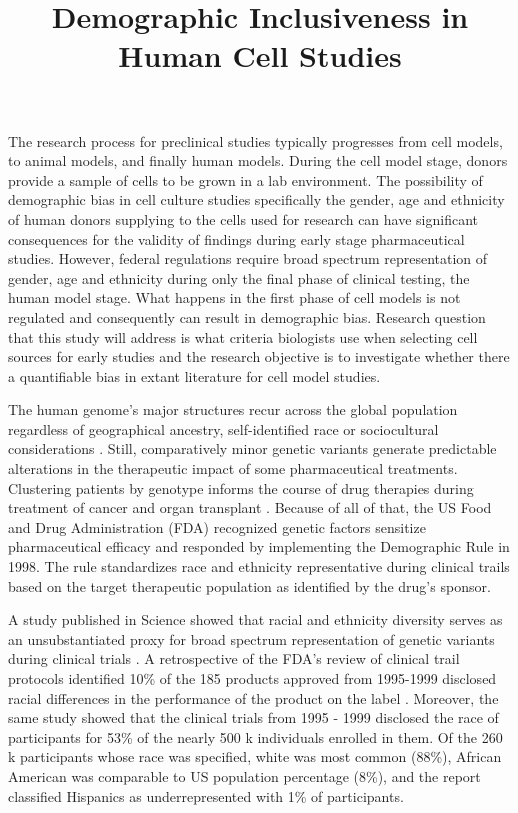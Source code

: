 \documentclass[10pt]{article}
\title{Demographic Inclusiveness in Human Cell Studies}
\begin{document}
\maketitle
  
The research process for preclinical studies typically progresses from cell models, to animal models, and finally human models. During the cell model stage, donors provide a sample of cells to be grown in a lab environment. The possibility of demographic bias in cell culture studies specifically the gender, age and ethnicity of human donors supplying to the cells used for research can have significant consequences for the validity of findings during early stage pharmaceutical studies. However, federal regulations require broad spectrum representation of gender, age and ethnicity during only the final phase of clinical testing, the human model stage. What happens in the first phase of cell models is not regulated and consequently can result in demographic bias. Research question that this study will address is what criteria biologists use when selecting cell sources for early studies and the research objective is to investigate whether there a quantifiable bias in extant literature for cell model studies.

The human genome's major structures recur across the global population regardless of geographical ancestry, self-identified race or sociocultural considerations \cite{xie2001molecular, cooper2003race}. Still, comparatively minor genetic variants generate predictable alterations in the therapeutic impact of some pharmaceutical treatments. Clustering patients by genotype informs the course of drug therapies during treatment of cancer and organ transplant \cite{krynetski2000genetic, higashi2002association}. Because of all of that, the US Food and Drug Administration (FDA) recognized genetic factors sensitize pharmaceutical efficacy and responded by implementing the Demographic Rule in 1998. The rule standardizes race and ethnicity representative during clinical trails based on the target therapeutic population as identified by the drug's sponsor. 

A study published in Science showed that racial and ethnicity diversity serves as an unsubstantiated proxy for broad spectrum representation of genetic variants during clinical trials \cite{haga2003fda}. A retrospective of the FDA's review of clinical trail protocols identified 10\% of the 185 products approved from 1995-1999 disclosed racial differences in the performance of the product on the label \cite{evelyn2001participation}. Moreover, the same study showed that the clinical trials from 1995 - 1999 disclosed the race of participants for 53\% of the nearly 500 k individuals enrolled in  them. Of the 260 k participants whose race was specified, white was most common (88\%), African American was comparable to US population percentage (8\%), and the report classified Hispanics as underrepresented with 1\% of participants.
\end{document}
